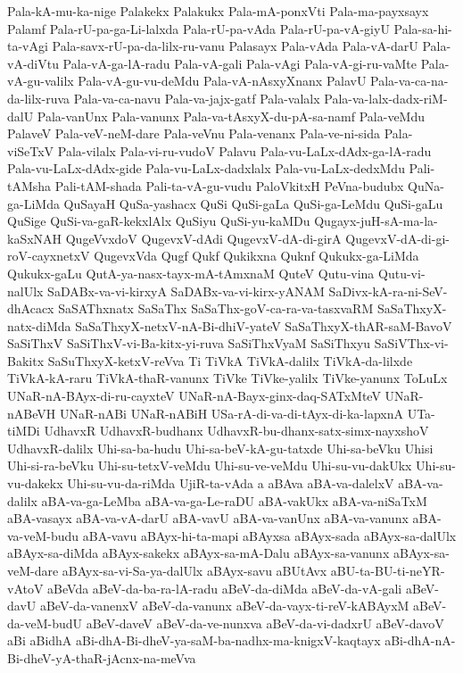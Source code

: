 {Pala-kA-mu-ka-nige
Palakekx
Palakukx
Pala-mA-ponxVti
Pala-ma-payxsayx
Palamf
Pala-rU-pa-ga-Li-lalxda
Pala-rU-pa-vAda
Pala-rU-pa-vA-giyU
Pala-sa-hi-ta-vAgi
Pala-savx-rU-pa-da-lilx-ru-vanu
Palasayx
Pala-vAda
Pala-vA-darU
Pala-vA-diVtu
Pala-vA-ga-lA-radu
Pala-vA-gali
Pala-vAgi
Pala-vA-gi-ru-vaMte
Pala-vA-gu-valilx
Pala-vA-gu-vu-deMdu
Pala-vA-nAsxyXnanx
PalavU
Pala-va-ca-na-da-lilx-ruva
Pala-va-ca-navu
Pala-va-jajx-gatf
Pala-valalx
Pala-va-lalx-dadx-riM-dalU
Pala-vanUnx
Pala-vanunx
Pala-va-tAsxyX-du-pA-sa-namf
Pala-veMdu
PalaveV
Pala-veV-neM-dare
Pala-veVnu
Pala-venanx
Pala-ve-ni-sida
Pala-viSeTxV
Pala-vilalx
Pala-vi-ru-vudoV
Palavu
Pala-vu-LaLx-dAdx-ga-lA-radu
Pala-vu-LaLx-dAdx-gide
Pala-vu-LaLx-dadxlalx
Pala-vu-LaLx-dedxMdu
Pali-tAMsha
Pali-tAM-shada
Pali-ta-vA-gu-vudu
PaloVkitxH
PeVna-budubx
QuNa-ga-LiMda
QuSayaH
QuSa-yashacx
QuSi
QuSi-gaLa
QuSi-ga-LeMdu
QuSi-gaLu
QuSige
QuSi-va-gaR-kekxlAlx
QuSiyu
QuSi-yu-kaMDu
Qugayx-juH-sA-ma-la-kaSxNAH
QugeVvxdoV
QugevxV-dAdi
QugevxV-dA-di-girA
QugevxV-dA-di-gi-roV-cayxnetxV
QugevxVda
Qugf
Qukf
Qukikxna
Quknf
Qukukx-ga-LiMda
Qukukx-gaLu
QutA-ya-nasx-tayx-mA-tAmxnaM
QuteV
Qutu-vina
Qutu-vi-nalUlx
SaDABx-va-vi-kirxyA
SaDABx-va-vi-kirx-yANAM
SaDivx-kA-ra-ni-SeV-dhAcacx
SaSAThxnatx
SaSaThx
SaSaThx-goV-ca-ra-va-tasxvaRM
SaSaThxyX-natx-diMda
SaSaThxyX-netxV-nA-Bi-dhiV-yateV
SaSaThxyX-thAR-saM-BavoV
SaSiThxV
SaSiThxV-vi-Ba-kitx-yi-ruva
SaSiThxVyaM
SaSiThxyu
SaSiVThx-vi-Bakitx
SaSuThxyX-ketxV-reVva
Ti
TiVkA
TiVkA-dalilx
TiVkA-da-lilxde
TiVkA-kA-raru
TiVkA-thaR-vanunx
TiVke
TiVke-yalilx
TiVke-yanunx
ToLuLx
UNaR-nA-BAyx-di-ru-cayxteV
UNaR-nA-Bayx-ginx-daq-SATxMteV
UNaR-nABeVH
UNaR-nABi
UNaR-nABiH
USa-rA-di-va-di-tAyx-di-ka-lapxnA
UTa-tiMDi
UdhavxR
UdhavxR-budhanx
UdhavxR-bu-dhanx-satx-simx-nayxshoV
UdhavxR-dalilx
Uhi-sa-ba-hudu
Uhi-sa-beV-kA-gu-tatxde
Uhi-sa-beVku
Uhisi
Uhi-si-ra-beVku
Uhi-su-tetxV-veMdu
Uhi-su-ve-veMdu
Uhi-su-vu-dakUkx
Uhi-su-vu-dakekx
Uhi-su-vu-da-riMda
UjiR-ta-vAda
a
aBAva
aBA-va-dalelxV
aBA-va-dalilx
aBA-va-ga-LeMba
aBA-va-ga-Le-raDU
aBA-vakUkx
aBA-va-niSaTxM
aBA-vasayx
aBA-va-vA-darU
aBA-vavU
aBA-va-vanUnx
aBA-va-vanunx
aBA-va-veM-budu
aBA-vavu
aBAyx-hi-ta-mapi
aBAyxsa
aBAyx-sada
aBAyx-sa-dalUlx
aBAyx-sa-diMda
aBAyx-sakekx
aBAyx-sa-mA-Dalu
aBAyx-sa-vanunx
aBAyx-sa-veM-dare
aBAyx-sa-vi-Sa-ya-dalUlx
aBAyx-savu
aBUtAvx
aBU-ta-BU-ti-neYR-vAtoV
aBeVda
aBeV-da-ba-ra-lA-radu
aBeV-da-diMda
aBeV-da-vA-gali
aBeV-davU
aBeV-da-vanenxV
aBeV-da-vanunx
aBeV-da-vayx-ti-reV-kABAyxM
aBeV-da-veM-budU
aBeV-daveV
aBeV-da-ve-nunxva
aBeV-da-vi-dadxrU
aBeV-davoV
aBi
aBidhA
aBi-dhA-Bi-dheV-ya-saM-ba-nadhx-ma-knigxV-kaqtayx
aBi-dhA-nA-Bi-dheV-yA-thaR-jAcnx-na-meVva
}
